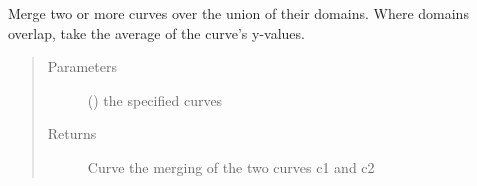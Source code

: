 \documentclass[letterpaper,10pt,english]{sphinxmanual}
\begin{document}
\begin{fulllineitems}
\label{\detokenize{pydv:pydvpy.appendcurves}}
Merge two or more curves over the union of their domains. Where domains overlap, take the
average of the curve’s y-values.

\begin{sphinxVerbatim}[commandchars=\\\{\}]
  
\end{sphinxVerbatim}

\begin{sphinxVerbatim}[commandchars=\\\{\}]
  
\end{sphinxVerbatim}
\begin{quote}\begin{description}
\item[{Parameters}] \leavevmode
{} () \textendash{} the specified curves

\item[{Returns}] \leavevmode
Curve \textendash{} the merging of the two curves c1 and c2

\end{description}\end{quote}

\end{fulllineitems}

\end{document}
